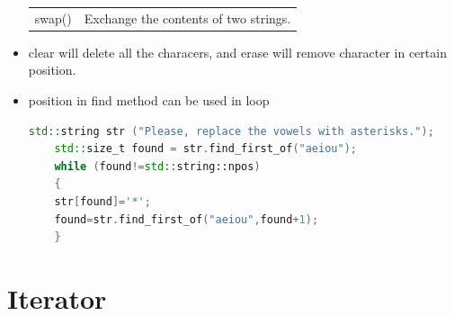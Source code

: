 \documentclass[a4paper,11pt,twoside]{book}
\renewcommand{\hline}{}
\begin{document}
\begin{itemize}
\begin{tabular}{| p{} |p{}|}
		
		\hline
		swap() & Exchange the contents of two strings. \\
		\hline
	\end{tabular}
	
	\item clear will delete all the characers, and erase will remove character in certain position.
	
	\item position in find method can be used in loop
	\begin{lstlisting}[frame=single, language=c++]
	std::string str ("Please, replace the vowels with asterisks.");
	std::size_t found = str.find_first_of("aeiou");
	while (found!=std::string::npos)
	{
	str[found]='*';
	found=str.find_first_of("aeiou",found+1);
	}
	\end{lstlisting}
	
	
\end{itemize}




\section{Iterator}
\end{document}
